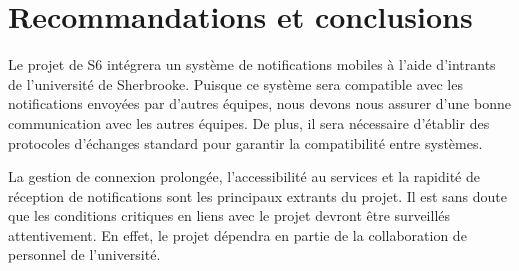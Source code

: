 \section{Recommandations et conclusions}
Le projet de S6 intégrera un système de notifications mobiles à l’aide d’intrants de l’université de Sherbrooke. Puisque ce système sera compatible avec les notifications envoyées par d’autres équipes, nous devons nous assurer d’une bonne communication avec les autres équipes. De plus, il sera nécessaire d’établir des protocoles d’échanges standard pour garantir la compatibilité entre systèmes. 

La gestion de connexion prolongée, l'accessibilité au services et la rapidité de réception de notifications sont les principaux extrants du projet. Il est sans doute que les conditions critiques en liens avec le projet devront être surveillés attentivement. En effet, le projet dépendra en partie de la collaboration de personnel de l’université.
